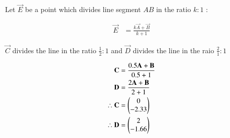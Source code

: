 \begin{flushleft}
Let $\vec{E}$ be a point which divides line segment $AB$
in the ratio $k : 1$ :
\end{flushleft}
\begin{align}
\vec{E} &= \frac{k\vec{A}+\vec{B}}{k+1}
\end{align}

\begin{flushleft}
$\vec{C}$ divides the line in the ratio $\frac{1}{2} : 1 $ and $\vec{D}$ divides the line in the raio $\frac{2}{1} : 1 $
\end{flushleft}
\begin{align}
\mathbf{C} &= \frac{0.5\mathbf{A}+\mathbf{B}}{0.5+1} \\
\mathbf{D} &= \frac{2\mathbf{A}+\mathbf{B}}{2+1}\\
\therefore \mathbf{C} &= \begin{pmatrix}0\\-2.33\end{pmatrix}\\
\therefore \mathbf{D} &= \begin{pmatrix}2\\-1.66\end{pmatrix}
\end{align}
